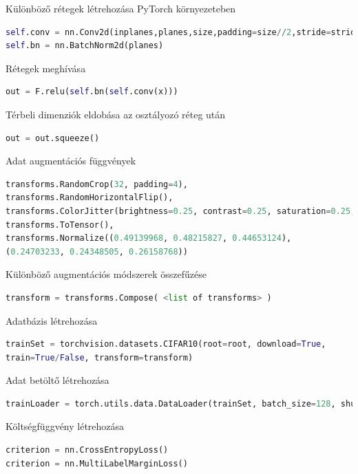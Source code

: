 \documentclass[12pt,a4paper,oneside]{report}             %
\begin{document}
Különböző rétegek létrehozása PyTorch környezeteben

\begin{lstlisting}[language=Python]
self.conv = nn.Conv2d(inplanes,planes,size,padding=size//2,stride=stride)
self.bn = nn.BatchNorm2d(planes)
\end{lstlisting}

Rétegek meghívása

\begin{lstlisting}[language=Python]
out = F.relu(self.bn(self.conv(x)))
\end{lstlisting}

Térbeli dimenziók eldobása az osztályozó réteg után

\begin{lstlisting}[language=Python]
out = out.squeeze()
\end{lstlisting}

Adat augmentációs függvények

\begin{lstlisting}[language=Python]
transforms.RandomCrop(32, padding=4),
transforms.RandomHorizontalFlip(),
transforms.ColorJitter(brightness=0.25, contrast=0.25, saturation=0.25, hue=0.2),
transforms.ToTensor(),
transforms.Normalize((0.49139968, 0.48215827, 0.44653124),
(0.24703233, 0.24348505, 0.26158768))
\end{lstlisting}

Különböző augmentációs módszerek összefűzése

\begin{lstlisting}[language=Python]
transform = transforms.Compose( <list of transforms> )
\end{lstlisting}

Adatbázis létrehozása

\begin{lstlisting}[language=Python]
trainSet = torchvision.datasets.CIFAR10(root=root, download=True,
train=True/False, transform=transform)
\end{lstlisting}

Adat betöltő létrehozása

\begin{lstlisting}[language=Python]
trainLoader = torch.utils.data.DataLoader(trainSet, batch_size=128, shuffle=True, num_workers=2)
\end{lstlisting}

Költségfüggvény létrehozása

\begin{lstlisting}[language=Python]
criterion = nn.CrossEntropyLoss()
criterion = nn.MultiLabelMarginLoss()
\end{lstlisting}
\end{document}
